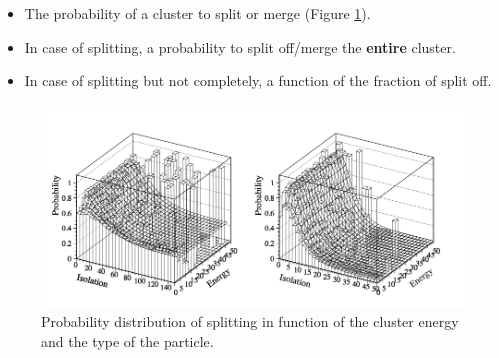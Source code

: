 \documentclass[a4paper,12pt]{article}
\begin{document}
\begin{itemize}
\item The probability of a cluster to split or merge (Figure \ref{fig:proba_split}).
\item In case of splitting, a probability to split off/merge the \textbf{entire} cluster.
\item In case of splitting but not completely, a function of the fraction of split off.
\end{itemize}
\begin{figure}[!h]
   \centering
   \includegraphics[scale=0.4]{prob_split.png} 
       \caption{Probability distribution of splitting in function of the cluster energy and the type of the particle.}
   \label{fig:proba_split}
\end{figure}
\end{document}
